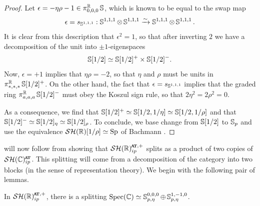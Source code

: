 \begin{proof}
  Let $\epsilon = -\eta \rho - 1 \in \pi_{0,0,0} ^{\mathbb{R}} \operatorname{\mathbb{S}}$, which is known to be equal to the swap map
  \[\epsilon = s_{\operatorname{\mathbb{S}}^{1,1,1}} : \operatorname{\mathbb{S}}^{1,1,1} \otimes \operatorname{\mathbb{S}}^{1,1,1} \xrightarrow{\sim} \operatorname{\mathbb{S}}^{1,1,1} \otimes \operatorname{\mathbb{S}}^{1,1,1}. \]
  It is clear from this description that $\epsilon^2 = 1$, so that after inverting $2$ we have a decomposition of the unit into $\pm 1$-eigenspaces
  \[\operatorname{\mathbb{S}} [1/2] \simeq \operatorname{\mathbb{S}} [1/2]^+ \times \operatorname{\mathbb{S}}[1/2]^-.\]
  Now, $\epsilon = +1$ implies that $\eta\rho = -2$, so that $\eta$ and $\rho$ must be units in $\pi_{*,*,*} ^{\mathbb{R}} \operatorname{\mathbb{S}}[1/2]^+$.
  On the other hand, the fact that $\epsilon = s_{\operatorname{\mathbb{S}}^{1,1,1}}$ implies that the graded ring
  $\pi_{a,a,a}^{\mathbb{R}} \operatorname{\mathbb{S}}[1/2]^{-}$
  must obey the Koszul sign rule, so that $2 \eta^2 = 2 \rho^2 = 0$.

  As a consequence, we find that $\operatorname{\mathbb{S}}[1/2]^{+} \simeq \operatorname{\mathbb{S}}[1/2,1/\eta] \simeq \operatorname{\mathbb{S}}[1/2,1/\rho]$ and that $\operatorname{\mathbb{S}}[1/2]^- \simeq \operatorname{\mathbb{S}}[1/2]_\eta \simeq \operatorname{\mathbb{S}}[1/2]_\rho$.
  To conclude, we base change from $\operatorname{\mathbb{S}}[1/2]$ to $\operatorname{\mathbb{S}}_p$ and use the equivalence $\mathcal{SH}(\mathbb{R})[1/\rho] \simeq \operatorname{\mathrm{Sp}}$ of Bachmann \cite{RealEtale}.
\end{proof}
%
%
%

 will now follow from showing that $\SHR_{ip}^{\at,+}$ splits as a product of two copies of $\SHCat$. This splitting will come from a decomposition of the category into two blocks (in the sense of representation theory). We begin with the following pair of lemmas.

\begin{lem} \label{lem:odd-split}
  In $\SHR_{ip}^{\at,+}$, there is a splitting $\operatorname{\mathrm{Spec}}(\mathbb{C}) \simeq \operatorname{\mathbb{S}}_{p,\eta}^{0,0,0} \oplus \operatorname{\mathbb{S}}_{p,\eta}^{1,-1,0}$.
\end{lem}

